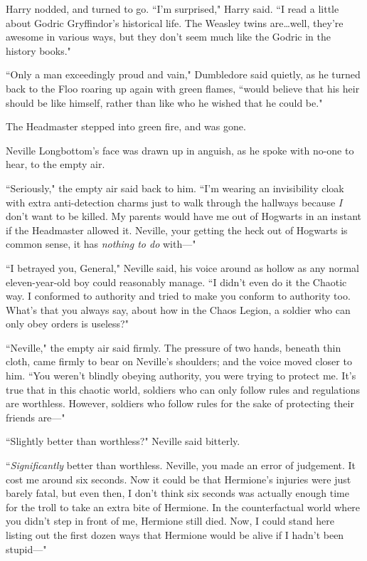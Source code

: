Harry nodded, and turned to go. ``I'm surprised," Harry said. ``I read a little about Godric Gryffindor's historical life. The Weasley twins are…well, they're awesome in various ways, but they don't seem much like the Godric in the history books."

``Only a man exceedingly proud and vain," Dumbledore said quietly, as he turned back to the Floo roaring up again with green flames, ``would believe that his heir should be like himself, rather than like who he wished that he could be."

The Headmaster stepped into green fire, and was gone.


Neville Longbottom's face was drawn up in anguish, as he spoke with no-one to hear, to the empty air.

``Seriously," the empty air said back to him. ``I'm wearing an invisibility cloak with extra anti-detection charms just to walk through the hallways because \emph{I} don't want to be killed. My parents would have me out of Hogwarts in an instant if the Headmaster allowed it. Neville, your getting the heck out of Hogwarts is common sense, it has \emph{nothing to do} with—"

``I betrayed you, General," Neville said, his voice around as hollow as any normal eleven-year-old boy could reasonably manage. ``I didn't even do it the Chaotic way. I conformed to authority and tried to make you conform to authority too. What's that you always say, about how in the Chaos Legion, a soldier who can only obey orders is useless?"

``Neville," the empty air said firmly. The pressure of two hands, beneath thin cloth, came firmly to bear on Neville's shoulders; and the voice moved closer to him. ``You weren't blindly obeying authority, you were trying to protect me. It's true that in this chaotic world, soldiers who can only follow rules and regulations are worthless. However, soldiers who follow rules for the sake of protecting their friends are—"

``Slightly better than worthless?" Neville said bitterly.

``\emph{Significantly} better than worthless. Neville, you made an error of judgement. It cost me around six seconds. Now it could be that Hermione's injuries were just barely fatal, but even then, I don't think six seconds was actually enough time for the troll to take an extra bite of Hermione. In the counterfactual world where you didn't step in front of me, Hermione still died. Now, I could stand here listing out the first dozen ways that Hermione would be alive if I hadn't been stupid—"

